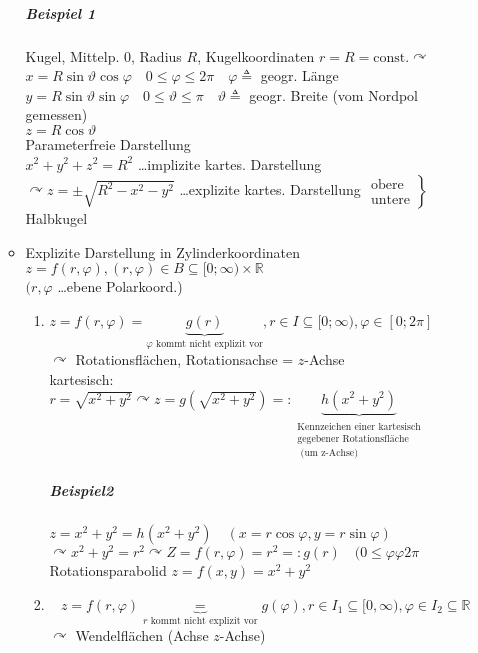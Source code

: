 \documentclass[a4paper]{scrartcl}
\begin{document}
\begin{enumerate}
\begin{itemize}
\subparagraph{Beispiel 1} Kugel, Mittelp. $0$, Radius $R$, Kugelkoordinaten $r=R=\text{const.} \curvearrowright$\\
$x= R \sin{\vartheta} \cos{\varphi} \quad 0 \leq \varphi \leq 2 \pi \quad \varphi \triangleq$ geogr. Länge\\
$y= R \sin{\vartheta} \sin{\varphi} \quad 0 \leq \vartheta \leq \pi \quad \vartheta \triangleq$ geogr. Breite (vom Nordpol gemessen)\\
$z = R \cos{\vartheta}$\\
Parameterfreie Darstellung\\
$x^2+y^2+z^2=R^2$ \dots implizite kartes. Darstellung\\
$\curvearrowright z = \pm \sqrt{R^2-x^2-y^2}$ \dots explizite kartes. Darstellung $\left. \begin{array}{c} \text{obere} \\ \text{untere} \end{array} \right \}$ Halbkugel

\item Explizite Darstellung in Zylinderkoordinaten\\
$z=f(r,\varphi),(r,\varphi) \in B \subseteq [0;\infty) \times \mathbb{R}$\\
$(r,\varphi$ \dots ebene Polarkoord.)
\begin{enumerate}
\item $z=f(r,\varphi) = \underbrace{g(r)}_{\varphi \text{ kommt nicht explizit vor}}, r \in I \subseteq [0;\infty), \varphi \in [0;2\pi]$\\
$\curvearrowright$ Rotationsflächen, Rotationsachse = $z$-Achse\\
kartesisch: $r = \sqrt{x^2+y^2} \curvearrowright z=g(\sqrt{x^2+y^2}) =: \underbrace{h(x^2+y^2)}_{\begin{array}{c}\text{Kennzeichen einer kartesisch} \\ \text{gegebener Rotationsfläche} \\ \text{ (um z-Achse)}\end{array} }$
\subparagraph{Beispiel2} $z=x^2+y^2 = h(x^2+y^2) \quad (x=r \cos{\varphi}, y= r \sin{\varphi})$\\
$\curvearrowright x^2+y^2=r^2 \curvearrowright Z =f(r,\varphi) = r^2 =: g(r) \quad (0 \leq \varphi \varphi 2\pi$\\
Rotationsparabolid $z=f(x,y) = x^2+y^2$

\item \[z=f(r,\varphi)\underbrace{=}_{r \text{ kommt nicht explizit vor}} g(\varphi), r \in I_1 \subseteq[0,\infty), \varphi \in I_2 \subseteq \mathbb{R} \]
$\curvearrowright$ Wendelflächen (Achse $z$-Achse)


\end{enumerate}
\end{itemize}
\end{enumerate}
\end{document}
